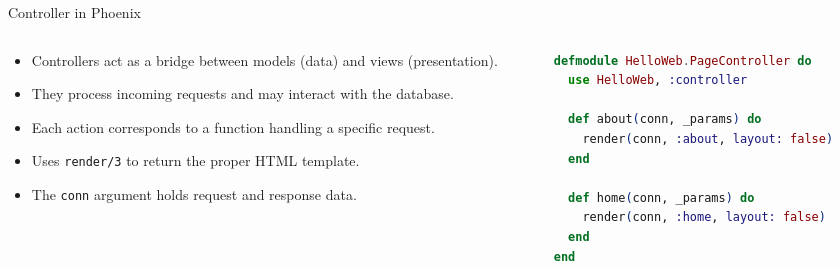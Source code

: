 \documentclass[aspectratio=169, table]{beamer}
\begin{document}
\begin{frame}[fragile]{Controller in Phoenix}
\vspace{15pt}

\begin{columns}
  \begin{column}[t]{0.45\textwidth}
    \begin{itemize}
      \item Controllers act as a bridge between models (data) and views (presentation).
      \item They process incoming requests and may interact with the database.
      \item Each action corresponds to a function handling a specific request.
      \item Uses \texttt{render/3} to return the proper HTML template.
      \item The \texttt{conn} argument holds request and response data.
    \end{itemize}
  \end{column}

  \begin{column}[t]{0.5\textwidth}
\begin{lstlisting}[language=Elixir]
defmodule HelloWeb.PageController do
  use HelloWeb, :controller

  def about(conn, _params) do
    render(conn, :about, layout: false)
  end

  def home(conn, _params) do
    render(conn, :home, layout: false)
  end
end
\end{lstlisting}
  \end{column}
\end{columns}
\end{frame}
\end{document}
